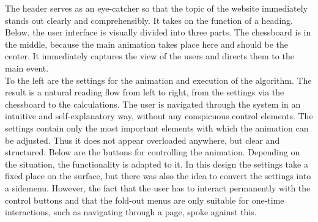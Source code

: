 The header serves as an eye-catcher so that the topic of the website immediately stands out clearly and comprehensibly. It takes on the function of a heading. 
\\
Below, the user interface is visually divided into three parts. The chessboard is in the middle, because the main animation takes place here and should be the center. It immediately captures the view of the users and directs them to the main event. 
\\
To the left are the settings for the animation and execution of the algorithm. The result is a natural reading flow from left to right, from the settings via the chessboard to the calculations. The user is navigated through the system in an intuitive and self-explanatory way, without any conspicuous control elements. The settings contain only the most important elements with which the animation can be adjusted. Thus it does not appear overloaded anywhere, but clear and structured. Below are the buttons for controlling the animation. Depending on the situation, the functionality is adapted to it. In this design the settings take a fixed place on the surface, but there was also the idea to convert the settings into a sidemenu. However, the fact that the user has to interact permanently with the control buttons and that the fold-out menus are only suitable for one-time interactions, such as navigating through a page, spoke against this. 
